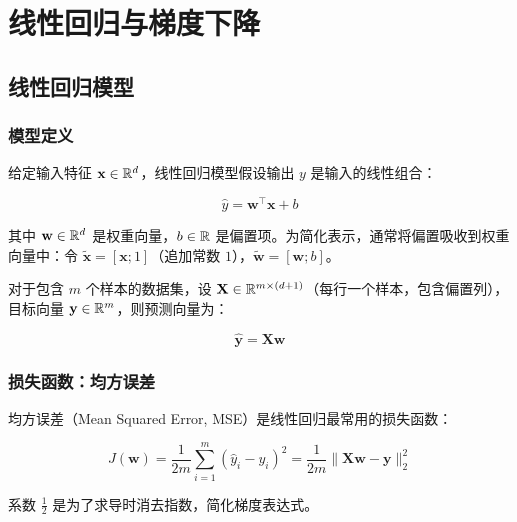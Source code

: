 \chapter{线性回归与梯度下降}


\section{线性回归模型}

\subsection{模型定义}

给定输入特征 $\mathbf{x}\in\mathbb{R}^d$，线性回归模型假设输出 $y$ 是输入的线性组合：

\[
\hat{y} = \mathbf{w}^{\top}\mathbf{x} + b
\]

其中 $\mathbf{w}\in\mathbb{R}^d$ 是权重向量，$b\in\mathbb{R}$ 是偏置项。为简化表示，通常将偏置吸收到权重向量中：令 $\tilde{\mathbf{x}}=[\mathbf{x};1]$（追加常数 $1$），$\tilde{\mathbf{w}}=[\mathbf{w};b]$。

对于包含 $m$ 个样本的数据集，设 $\mathbf{X}\in\mathbb{R}^{m\times (d+1)}$（每行一个样本，包含偏置列），目标向量 $\mathbf{y}\in\mathbb{R}^m$，则预测向量为：

\[
\hat{\mathbf{y}} = \mathbf{X}\mathbf{w}
\]

\subsection{损失函数：均方误差}

均方误差（Mean Squared Error, MSE）是线性回归最常用的损失函数：

\[
J(\mathbf{w}) = \frac{1}{2m}\sum_{i=1}^{m} (\hat{y}_i - y_i)^2 = \frac{1}{2m}\|\mathbf{X}\mathbf{w} - \mathbf{y}\|_2^2
\]

系数 $\frac{1}{2}$ 是为了求导时消去指数，简化梯度表达式。

